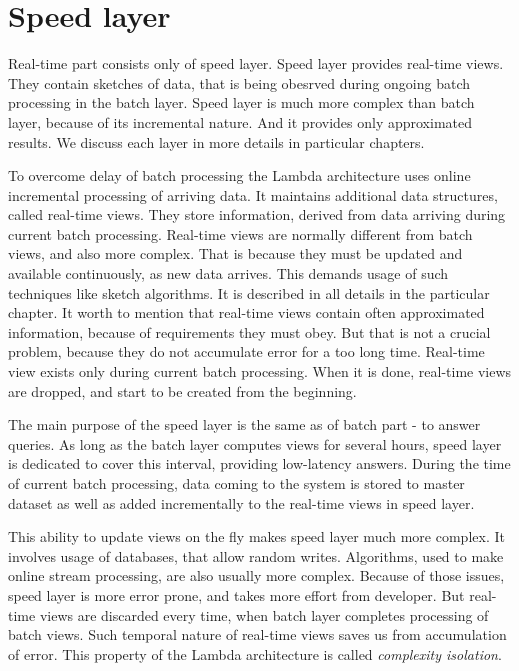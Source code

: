 \section{Speed layer}

Real-time part consists only of speed layer.
Speed layer provides real-time views.
They contain sketches of data, that is being obesrved during ongoing batch processing in the batch layer.
Speed layer is much more complex than batch layer, because of its incremental nature.
And it provides only approximated results.
We discuss each layer in more details in particular chapters.

To overcome delay of batch processing the Lambda architecture uses online incremental processing of arriving data.
It maintains additional data structures, called real-time views.
They store information, derived from data arriving during current batch processing.
Real-time views are normally different from batch views, and also more complex.
That is because they must be updated and available continuously, as new data arrives.
This demands usage of such techniques like sketch algorithms.
It is described in all details in the particular chapter.
It worth to mention that real-time views contain often approximated information, because of requirements they must obey.
But that is not a crucial problem, because they do not accumulate error for a too long time.
Real-time view exists only during current batch processing.
When it is done, real-time views are dropped, and start to be created from the beginning.

The main purpose of the speed layer is the same as of batch part - to answer queries.
As long as the batch layer computes views for several hours, speed layer is dedicated to cover this interval, providing low-latency answers.
During the time of current batch processing, data coming to the system is stored to master dataset as well as added incrementally to the real-time views in speed layer.

This ability to update views on the fly makes speed layer much more complex.
It involves usage of databases, that allow random writes.
Algorithms, used to make online stream processing, are also usually more complex.
Because of those issues, speed layer is more error prone, and takes more effort from developer.
But real-time views are discarded every time, when batch layer completes processing of batch views.
Such temporal nature of real-time views saves us from accumulation of error.
This property of the Lambda architecture is called \textit{complexity isolation}.

